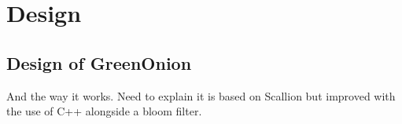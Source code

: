 \chapter{Design}
\label{cha:Design}

\section{Design of GreenOnion}
And the way it works. Need to explain it is based on Scallion but improved with the use of C++ alongside a bloom filter.